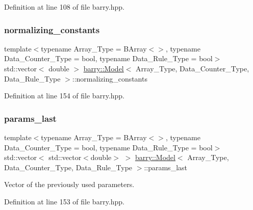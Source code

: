 Definition at line 108 of file barry.\+hpp.

\mbox{\label{classbarry_1_1_model_a600630f5fad408c157b21404dbde4bc1}} 
\subsubsection{\texorpdfstring{normalizing\+\_\+constants}{normalizing\_constants}}
{\footnotesize\ttfamily template$<$typename Array\+\_\+\+Type  = B\+Array$<$$>$, typename Data\+\_\+\+Counter\+\_\+\+Type  = bool, typename Data\+\_\+\+Rule\+\_\+\+Type  = bool$>$ \\
std\+::vector$<$ double $>$ \hyperlink{classbarry_1_1_model}{barry\+::\+Model}$<$ Array\+\_\+\+Type, Data\+\_\+\+Counter\+\_\+\+Type, Data\+\_\+\+Rule\+\_\+\+Type $>$\+::normalizing\+\_\+constants}



Definition at line 154 of file barry.\+hpp.

\mbox{\label{classbarry_1_1_model_ace8577c5c0c7bd927a2337515155ab6f}} 
\subsubsection{\texorpdfstring{params\+\_\+last}{params\_last}}
{\footnotesize\ttfamily template$<$typename Array\+\_\+\+Type  = B\+Array$<$$>$, typename Data\+\_\+\+Counter\+\_\+\+Type  = bool, typename Data\+\_\+\+Rule\+\_\+\+Type  = bool$>$ \\
std\+::vector$<$ std\+::vector$<$double$>$ $>$ \hyperlink{classbarry_1_1_model}{barry\+::\+Model}$<$ Array\+\_\+\+Type, Data\+\_\+\+Counter\+\_\+\+Type, Data\+\_\+\+Rule\+\_\+\+Type $>$\+::params\+\_\+last}



Vector of the previously used parameters. 



Definition at line 153 of file barry.\+hpp.

\mbox{\label{classbarry_1_1_model_ae5aad2049cc19ee36e9c2cfefd65a0dd}} 
